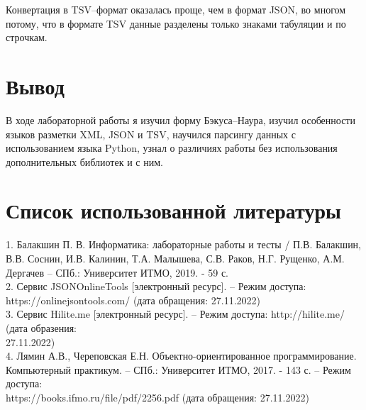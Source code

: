 \documentclass[12pt]{article}
\begin{document}
Конвертация в TSV--формат оказалась проще, чем в формат JSON, во многом потому, что в формате TSV данные разделены только знаками табуляции и по строчкам.

\newpage

\section{Вывод}

В ходе лабораторной работы я изучил форму Бэкуса--Наура, изучил особенности языков разметки XML, JSON и TSV, научился парсингу данных с использованием языка Python, узнал о различиях работы без использования дополнительных библиотек и с ним.

\section{Список использованной литературы}

1. Балакшин П. В. Информатика: лабораторные работы и тесты / П.В. Балакшин, В.В. Соснин, И.В. Калинин, Т.А. Малышева, С.В. Раков, Н.Г. Рущенко, А.М. Дергачев – СПб.: Университет ИТМО, 2019. - 59 с.\\
2. Сервис JSONOnlineTools [электронный ресурс]. – Режим доступа: https://onlinejsontools.com/ (дата обращения: 27.11.2022)\\
3. Сервис Hilite.me [электронный ресурс]. – Режим доступа: http://hilite.me/ (дата образения:\\
27.11.2022)\\
4. Лямин А.В., Череповская Е.Н. Объектно-ориентированное программирование. Компьютерный практикум. – СПб.: Университет ИТМО, 2017. - 143 с. – Режим доступа:\\ https://books.ifmo.ru/file/pdf/2256.pdf (дата обращения: 27.11.2022)
\end{document}
